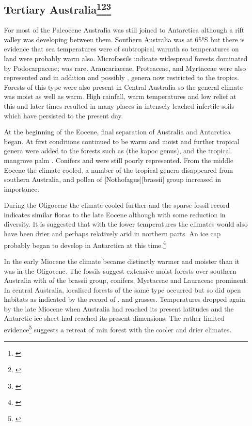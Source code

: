 \subsection[Tertiary Australia]{Tertiary Australia\footnote{\cite{kemp1978tertiary}}\footnote{\cite{martin1981tertiary}}\footnote{\cite{smith1982history}}}

For most of the Paleocene Australia was still joined to Antarctica although a rift valley was developing between them.
Southern Australia was at 65°S but there is evidence that sea temperatures were of subtropical warmth so temperatures on land were probably warm also.
Microfossils indicate widespread forests dominated by Podocarpaceae;  was rare.
Araucariaceae, Proteaceae, and Myrtaceae were also represented and in addition  and possibly , genera now restricted to the tropics.
Forests of this type were also present in Central Australia so the general climate was moist as well as warm.
High rainfall, warm temperatures and low relief at this and later times resulted in many places in intensely leached infertile soils which have persisted to the present day.

At the beginning of the Eocene, final separation of Australia and Antarctica began.
At first conditions continued to be warm and moist and further tropical genera were added to the forests such as  (the kapoc genus), and the tropical mangrove palm .
Conifers and  were still poorly represented.
From the middle Eocene the climate cooled, a number of the tropical genera disappeared from southern Australia, and pollen of [Nothofagus][brassii] group increased in importance.

During the Oligocene the climate cooled further and the sparse fossil record indicates similar floras to the late Eocene although with some reduction in diversity.
It is suggested that with the lower temperatures the climates would also have been drier and perhaps relatively arid in northern parts.
An ice cap probably began to develop in Antarctica at this time.\footnote{\cite{kemp1978tertiary}}

In the early Miocene the climate became distinctly warmer and moister than it was in the Oligocene.
The fossils suggest extensive moist forests over southern Australia with  of the brassii group, conifers, Myrtaceae and Lauraceae prominent.
In central Australia, localised forests of the same type occurred but so did open habitats as indicated by the record of ,  and grasses.
Temperatures dropped again by the late Miocene when Australia had reached its present latitudes and the Antarctic ice sheet had reached its present dimensions.
The rather limited evidence\footnote{\cite{kemp1978tertiary}} suggests a retreat of rain forest with the cooler and drier climates.


